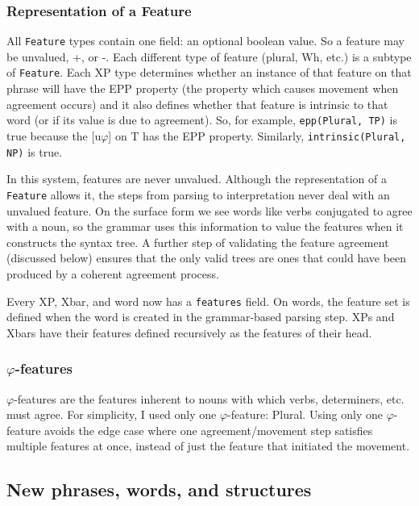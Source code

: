 \documentclass[11pt]{article}
\begin{document}
\subsubsection{Representation of a Feature}
All \texttt{Feature} types contain one field: an optional boolean value. So a feature may be
unvalued, +, or -. Each different type of feature (plural, Wh, etc.) is a subtype of \texttt{Feature}.
Each XP type determines whether an instance of that feature on that phrase will have the EPP property
(the property which causes movement when agreement occurs) and it also defines whether that feature
is intrinsic to that word (or if its value is due to agreement). So, for example, \texttt{epp(Plural, TP)}
is true because the [u$\varphi$] on T has the EPP property. Similarly, \texttt{intrinsic(Plural, NP)} is true.

In this system, features are never unvalued. Although the representation of a \texttt{Feature} allows
it, the steps from parsing to interpretation never deal with an unvalued feature. On the surface form
we see words like verbs conjugated to agree with a noun, so the grammar uses this information to value
the features when it constructs
the syntax tree. A further step of validating the feature agreement (discussed below) ensures that
the only valid trees are ones that could have been produced by a coherent agreement process.

Every XP, Xbar, and word now has a \texttt{features} field. On words, the feature set is defined
when the word is created in the grammar-based parsing step. XPs and Xbars have their features defined
recursively as the features of their head.

\subsubsection{$\varphi$-features}
$\varphi$-features are the features inherent to nouns with which verbs, determiners, etc. must agree. For
simplicity, I used only one $\varphi$-feature: Plural. Using only one $\varphi$-feature  avoids the
edge case where one agreement/movement step satisfies multiple features at once, instead of just the
feature that initiated the movement.

\subsection{New phrases, words, and structures}
\end{document}
